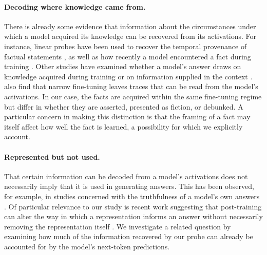 \paragraph{Decoding where knowledge came from.}
There is already some evidence that information about the circumstances under which a model acquired its knowledge can be recovered from its activations. For instance, linear probes have been used to recover the temporal provenance of factual statements \citep{rahman-etal-2026-language}, as well as how recently a model encountered a fact during training \citep{krasheninnikov2025freshmemorytrainingorderrecency}. Other studies have examined whether a model's answer draws on knowledge acquired during training or on information supplied in the context \citep{tighidet2024probinglanguagemodelsknowledge,brink2026probingknowledgeattributionlarge}. \citet{minder2026narrowfinetuningleavesclearly} also find that narrow fine-tuning leaves traces that can be read from the model's activations. In our case, the facts are acquired within the same fine-tuning regime but differ in whether they are asserted, presented as fiction, or debunked. A particular concern in making this distinction is that the framing of a fact may itself affect how well the fact is learned, a possibility for which we explicitly account.

\paragraph{Represented but not used.}
That certain information can be decoded from a model's activations does not necessarily imply that it is used in generating answers. This has been observed, for example, in studies concerned with the truthfulness of a model's own answers \citep{liu2023cognitivedissonancewhylanguage,orgad2024llmsknowmoreshow}. Of particular relevance to our study is recent work suggesting that post-training can alter the way in which a representation informs an answer without necessarily removing the representation itself \citep{laubrock2026representedmisreadposttrainingchanges,li2026erasedreroutedrescaledposttraining}. We investigate a related question by examining how much of the information recovered by our probe can already be accounted for by the model's next-token predictions.

